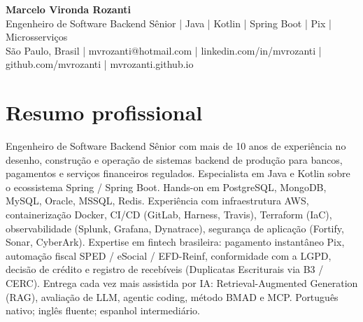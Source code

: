 \documentclass[10pt,a4paper]{article}
\begin{document}
\begin{center}
{\Large\bfseries Marcelo Vironda Rozanti}\\[2pt]
Engenheiro de Software Backend Sênior | Java | Kotlin | Spring Boot | Pix | Microsserviços\\[2pt]
São Paulo, Brasil | mvrozanti@hotmail.com | linkedin.com/in/mvrozanti | github.com/mvrozanti | mvrozanti.github.io
\end{center}

\section{Resumo profissional}
Engenheiro de Software Backend Sênior com mais de 10 anos de experiência no desenho, construção e operação de sistemas backend de produção para bancos, pagamentos e serviços financeiros regulados. Especialista em Java e Kotlin sobre o ecossistema Spring / Spring Boot. Hands-on em PostgreSQL, MongoDB, MySQL, Oracle, MSSQL, Redis. Experiência com infraestrutura AWS, containerização Docker, CI/CD (GitLab, Harness, Travis), Terraform (IaC), observabilidade (Splunk, Grafana, Dynatrace), segurança de aplicação (Fortify, Sonar, CyberArk). Expertise em fintech brasileira: pagamento instantâneo Pix, automação fiscal SPED / eSocial / EFD-Reinf, conformidade com a LGPD, decisão de crédito e registro de recebíveis (Duplicatas Escriturais via B3 / CERC). Entrega cada vez mais assistida por IA: Retrieval-Augmented Generation (RAG), avaliação de LLM, agentic coding, método BMAD e MCP. Português nativo; inglês fluente; espanhol intermediário.
\end{document}
